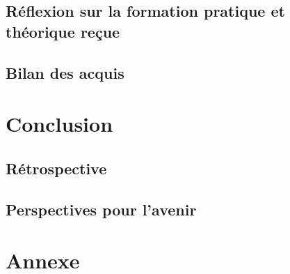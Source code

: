 \documentclass[12pt]{article} 	%
\begin{document}
\subsection{Réflexion sur la formation pratique et théorique reçue} %




\subsection{Bilan des acquis}


\newpage
\section{Conclusion}

\subsection{Rétrospective}

\subsection{Perspectives pour l’avenir} 


\newpage
\section{Annexe}
\end{document}
